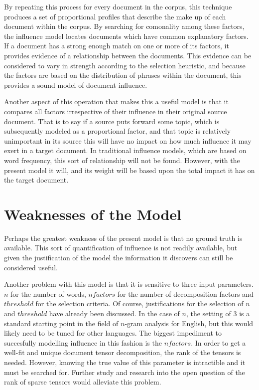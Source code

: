 \documentclass[../ut-dissertation.tex]{subfiles}
\begin{document}
By repeating this process for every document in the corpus, this
technique produces a set of proportional profiles that describe the
make up of each document within the corpus.  By searching for
comonality among these factors, the influence model locates documents
which have common explanatory factors.  If a document has a strong
enough match on one or more of its factors, it provides evidence of a
relationship between the documents.  This evidence can be considered
to vary in strength according to the selection heuristic, and because
the factors are based on the distribution of phrases within the
document, this provides a sound model of document influence.

Another aspect of this operation that makes this a useful model is
that it compares all factors irrespective of their influence in their
original source document.  That is to say if a source puts forward
some topic, which is subsequently modeled as a proportional factor,
and that topic is relatively unimportant in its source this will have
no impact on how much influence it may exert in a target document.  In
traditional influence models, which are based on word frequency, this
sort of relationship will not be found.  However, with the present
model it will, and its weight will be based upon the total impact it
has on the target document. 

\section{Weaknesses of the Model}
Perhaps the greatest weakness of the present model is that no ground
truth is available.  This sort of quantification of influence is not
readily available, but given the justification of the model the
information it discovers can still be considered useful.

Another problem with this model is that it is sensitive to three input
parameters.  $n$ for the number of words, $nfactors$ for the number of
decomposition factors and $threshold$ for the selection criteria.  Of
course, justifications for the selection of $n$ and $threshold$ have
already been discussed.  In the case of $n$, the setting of 3 is a
standard starting point in the field of $n$-gram analysis for English,
but this would likely need to be tuned for other languages.  The
biggest impediment to succesfully modelling influence in this fashion
is the $nfactors$.  In order to get a well-fit and unique document
tensor decomposition, the rank of the tensors is needed.  However,
knowing the true value of this parameter is intractible and it must be
searched for.  Further study and research into the open question of
the rank of sparse tensors would alleviate this problem.
\end{document}
